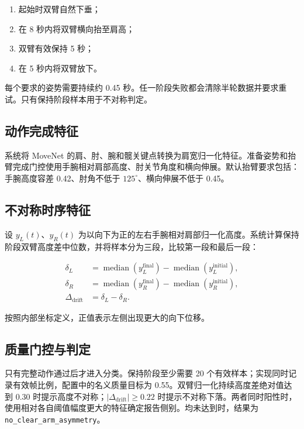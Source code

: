 \documentclass[11pt,a4paper]{article}
\begin{document}
\begin{enumerate}
  \item 起始时双臂自然下垂；
  \item 在 8 秒内将双臂横向抬至肩高；
  \item 双臂有效保持 5 秒；
  \item 在 5 秒内将双臂放下。
\end{enumerate}

每个要求的姿势需要持续约 0.45 秒。任一阶段失败都会清除半轮数据并要求重试。只有保持阶段样本用于不对称判定。

\subsection{动作完成特征}

系统将 MoveNet 的肩、肘、腕和髋关键点转换为肩宽归一化特征。准备姿势和抬臂完成门控使用手腕相对肩部高度、肘关节角度和横向伸展。默认抬臂要求包括：手腕高度容差 0.42、肘角不低于 $125^{\circ}$、横向伸展不低于 0.45。

\subsection{不对称时序特征}

设 $y_L(t)$、$y_R(t)$ 为以向下为正的左右手腕相对肩部归一化高度。系统计算保持阶段双臂高度差中位数，并将样本分为三段，比较第一段和最后一段：

\begin{align}
\delta_L &= \operatorname{median}(y_L^{\mathrm{final}})-\operatorname{median}(y_L^{\mathrm{initial}}),\\
\delta_R &= \operatorname{median}(y_R^{\mathrm{final}})-\operatorname{median}(y_R^{\mathrm{initial}}),\\
\Delta_{\mathrm{drift}} &= \delta_L-\delta_R.
\end{align}

按照内部坐标定义，正值表示左侧出现更大的向下位移。

\subsection{质量门控与判定}

只有完整动作通过后才进入分类。保持阶段至少需要 20 个有效样本；实现同时记录有效帧比例，配置中的名义质量目标为 0.55。双臂归一化持续高度差绝对值达到 0.30 时提示高度不对称；$|\Delta_{\mathrm{drift}}|\geq0.22$ 时提示不对称下落。两者同时阳性时，使用相对各自阈值幅度更大的特征确定报告侧别。均未达到时，结果为 \texttt{no\_clear\_arm\_asymmetry}。
\end{document}
